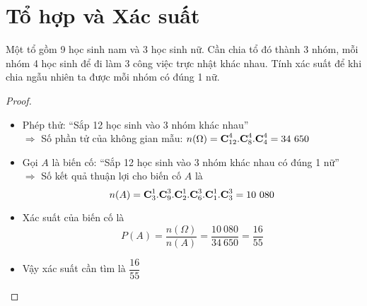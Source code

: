 \section{Tổ hợp và Xác suất}
\begin{dl}
	Một tổ gồm 9 học sinh nam và 3 học sinh nữ. Cần chia tổ đó thành 3 nhóm, mỗi nhóm 4 học sinh để đi làm 3 công việc trực nhật khác nhau. Tính xác suất để khi chia ngẫu nhiên ta được mỗi nhóm có đúng 1 nữ.
\end{dl}
\begin{proof}~
	\begin{itemize}
		\item Phép thử: ``Sắp 12 học sinh vào 3 nhóm khác nhau''\\[4pt]
		$\Rightarrow$ Số phần tử của không gian mẫu: $n(\Omega)=\mbox{\textbf{C}}_{12}^4.\mbox{\textbf{C}}^4_8.\mbox{\textbf{C}}_4^4=34~ 650$
		\item Gọi $A$ là biến cố: ``Sắp 12 học sinh vào 3 nhóm khác nhau có đúng 1 nữ''\\[4pt]
		$\Rightarrow$ Số kết quả thuận lợi cho biến cố $A$ là $$n(A)=\mbox{\textbf{C}}_3^1.\mbox{\textbf{C}}_9^3.\mbox{\textbf{C}}_2^1.\mbox{\textbf{C}}_6^3.\mbox{\textbf{C}}^1_1.\mbox{\textbf{C}}^3_3=10~080$$
		\item Xác suất của biến cố là
		$$P(A)=\frac{n(\Omega)}{n(A)}=\frac{10~080}{34~ 650}=\frac{16}{55}
		$$
		\item Vậy xác suất cần tìm là $\dfrac{16}{55}$
	\end{itemize}
\end{proof}
